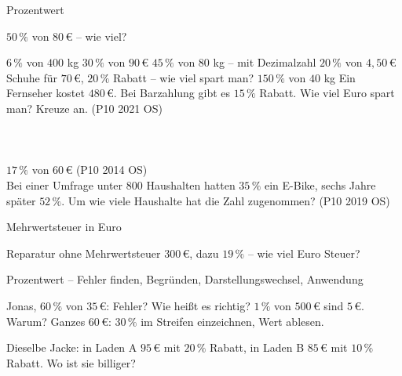 \setcounter{aufgabe}{16}

\begin{aufgabe}{Prozentwert}
\begin{teile}
\teil $50\,\%$ von $80\,€$ – wie viel?

\leerfeld[€]
\teil $6\,\%$ von $400$ kg \leerfeld[kg]
\teil $30\,\%$ von $90\,€$ \leerfeld[€]
\teil $45\,\%$ von $80$ kg – mit Dezimalzahl \leerfeld[kg]
\teil $20\,\%$ von $4{,}50\,€$ \leerfeld[€]
\teil Schuhe für $70\,€$, $20\,\%$ Rabatt – wie viel spart man? \leerfeld[€]
\teil $150\,\%$ von $40$ kg \leerfeld[kg]
\teil Ein Fernseher kostet $480\,€$. Bei Barzahlung gibt es $15\,\%$ Rabatt. Wie viel Euro spart man? Kreuze an. \hfill (P10 2021 OS)\\ \\ \\ \\ 
\teil $17\,\%$ von $60\,€$ \hfill (P10 2014 OS) \\ \leerfeld[€]
\teil Bei einer Umfrage unter $800$ Haushalten hatten $35\,\%$ ein E-Bike, sechs Jahre später $52\,\%$. Um wie viele Haushalte hat die Zahl zugenommen? \hfill (P10 2019 OS)
\end{teile}
\end{aufgabe}

\begin{aufgabe}{Mehrwertsteuer in Euro}
\begin{teile}
\teil Reparatur ohne Mehrwertsteuer $300\,€$, dazu $19\,\%$ – wie viel Euro Steuer? \leerfeld[€]
\end{teile}
\end{aufgabe}

\begin{aufgabe}{Prozentwert – Fehler finden, Begründen, Darstellungswechsel, Anwendung}
\begin{teile}
\teil Jonas, $60\,\%$ von $35\,€$:  Fehler? Wie heißt es richtig?
\teil $1\,\%$ von $500\,€$ sind $5\,€$. Warum?
\teil Ganzes $60\,€$: $30\,\%$ im Streifen einzeichnen, Wert ablesen.

\leerfeld[€]
\teil Dieselbe Jacke: in Laden A $95\,€$ mit $20\,\%$ Rabatt, in Laden B $85\,€$ mit $10\,\%$ Rabatt. Wo ist sie billiger?
\end{teile}
\end{aufgabe}

